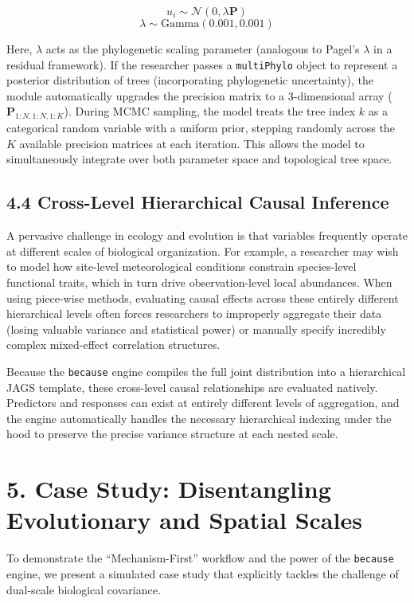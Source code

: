 \documentclass[
]{article}
\begin{document}
\[ u_i \sim \mathcal{N}(0, \lambda \mathbf{P}) \]
\[ \lambda \sim \text{Gamma}(0.001, 0.001) \]

Here, \(\lambda\) acts as the phylogenetic scaling parameter (analogous to Pagel's \(\lambda\) in a residual framework). If the researcher passes a \texttt{multiPhylo} object to represent a posterior distribution of trees (incorporating phylogenetic uncertainty), the module automatically upgrades the precision matrix to a 3-dimensional array (\(\mathbf{P}_{1:N, 1:N, 1:K}\)). During MCMC sampling, the model treats the tree index \(k\) as a categorical random variable with a uniform prior, stepping randomly across the \(K\) available precision matrices at each iteration. This allows the model to simultaneously integrate over both parameter space and topological tree space.

\subsection{4.4 Cross-Level Hierarchical Causal Inference}\label{cross-level-hierarchical-causal-inference}

A pervasive challenge in ecology and evolution is that variables frequently operate at different scales of biological organization. For example, a researcher may wish to model how site-level meteorological conditions constrain species-level functional traits, which in turn drive observation-level local abundances. When using piece-wise methods, evaluating causal effects across these entirely different hierarchical levels often forces researchers to improperly aggregate their data (losing valuable variance and statistical power) or manually specify incredibly complex mixed-effect correlation structures.

Because the \texttt{because} engine compiles the full joint distribution into a hierarchical JAGS template, these cross-level causal relationships are evaluated natively. Predictors and responses can exist at entirely different levels of aggregation, and the engine automatically handles the necessary hierarchical indexing under the hood to preserve the precise variance structure at each nested scale.

\section{5. Case Study: Disentangling Evolutionary and Spatial Scales}\label{case-study-disentangling-evolutionary-and-spatial-scales}

To demonstrate the ``Mechanism-First'' workflow and the power of the \texttt{because} engine, we present a simulated case study that explicitly tackles the challenge of dual-scale biological covariance.
\end{document}
